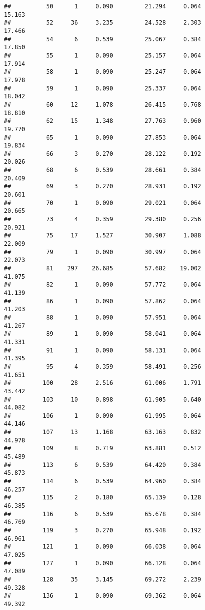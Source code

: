 \documentclass[
]{article}
\begin{document}
\begin{verbatim}
##          50      1     0.090         21.294     0.064         15.163
##          52     36     3.235         24.528     2.303         17.466
##          54      6     0.539         25.067     0.384         17.850
##          55      1     0.090         25.157     0.064         17.914
##          58      1     0.090         25.247     0.064         17.978
##          59      1     0.090         25.337     0.064         18.042
##          60     12     1.078         26.415     0.768         18.810
##          62     15     1.348         27.763     0.960         19.770
##          65      1     0.090         27.853     0.064         19.834
##          66      3     0.270         28.122     0.192         20.026
##          68      6     0.539         28.661     0.384         20.409
##          69      3     0.270         28.931     0.192         20.601
##          70      1     0.090         29.021     0.064         20.665
##          73      4     0.359         29.380     0.256         20.921
##          75     17     1.527         30.907     1.088         22.009
##          79      1     0.090         30.997     0.064         22.073
##          81    297    26.685         57.682    19.002         41.075
##          82      1     0.090         57.772     0.064         41.139
##          86      1     0.090         57.862     0.064         41.203
##          88      1     0.090         57.951     0.064         41.267
##          89      1     0.090         58.041     0.064         41.331
##          91      1     0.090         58.131     0.064         41.395
##          95      4     0.359         58.491     0.256         41.651
##         100     28     2.516         61.006     1.791         43.442
##         103     10     0.898         61.905     0.640         44.082
##         106      1     0.090         61.995     0.064         44.146
##         107     13     1.168         63.163     0.832         44.978
##         109      8     0.719         63.881     0.512         45.489
##         113      6     0.539         64.420     0.384         45.873
##         114      6     0.539         64.960     0.384         46.257
##         115      2     0.180         65.139     0.128         46.385
##         116      6     0.539         65.678     0.384         46.769
##         119      3     0.270         65.948     0.192         46.961
##         121      1     0.090         66.038     0.064         47.025
##         127      1     0.090         66.128     0.064         47.089
##         128     35     3.145         69.272     2.239         49.328
##         136      1     0.090         69.362     0.064         49.392

\end{verbatim}
\end{document}
